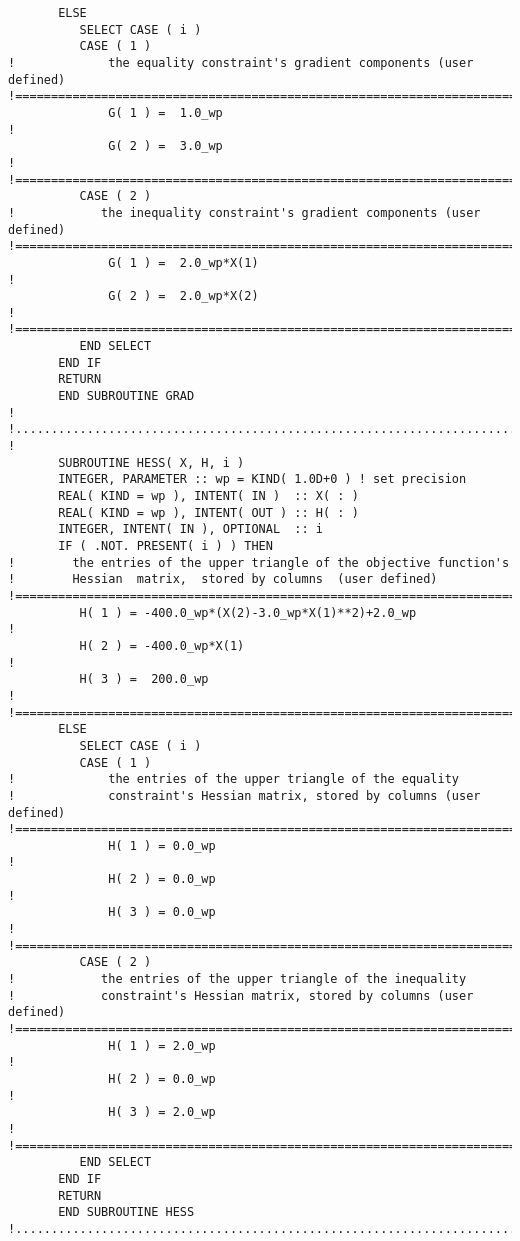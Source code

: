 \documentclass{galahad}
\begin{document}
{\begin{verbatim}
       ELSE
          SELECT CASE ( i )
          CASE ( 1 )   
!             the equality constraint's gradient components (user defined)
!==============================================================================
              G( 1 ) =  1.0_wp                                                !
              G( 2 ) =  3.0_wp                                                !
!==============================================================================
          CASE ( 2 )    
!            the inequality constraint's gradient components (user defined)
!==============================================================================
              G( 1 ) =  2.0_wp*X(1)                                           !
              G( 2 ) =  2.0_wp*X(2)                                           !
!==============================================================================
          END SELECT
       END IF
       RETURN
       END SUBROUTINE GRAD
!
!.............................................................................
!
       SUBROUTINE HESS( X, H, i )
       INTEGER, PARAMETER :: wp = KIND( 1.0D+0 ) ! set precision
       REAL( KIND = wp ), INTENT( IN )  :: X( : )
       REAL( KIND = wp ), INTENT( OUT ) :: H( : )
       INTEGER, INTENT( IN ), OPTIONAL  :: i
       IF ( .NOT. PRESENT( i ) ) THEN
!        the entries of the upper triangle of the objective function's 
!        Hessian  matrix,  stored by columns  (user defined) 
!==============================================================================
          H( 1 ) = -400.0_wp*(X(2)-3.0_wp*X(1)**2)+2.0_wp                     !
          H( 2 ) = -400.0_wp*X(1)                                             !
          H( 3 ) =  200.0_wp                                                  !
!==============================================================================
       ELSE
          SELECT CASE ( i )
          CASE ( 1 )
!             the entries of the upper triangle of the equality 
!             constraint's Hessian matrix, stored by columns (user defined)
!==============================================================================
              H( 1 ) = 0.0_wp                                                 !
              H( 2 ) = 0.0_wp                                                 !
              H( 3 ) = 0.0_wp                                                 !
!==============================================================================
          CASE ( 2 )
!            the entries of the upper triangle of the inequality 
!            constraint's Hessian matrix, stored by columns (user defined) 
!==============================================================================
              H( 1 ) = 2.0_wp                                                 !
              H( 2 ) = 0.0_wp                                                 !
              H( 3 ) = 2.0_wp                                                 !
!==============================================================================
          END SELECT
       END IF
       RETURN
       END SUBROUTINE HESS
!..............................................................................
\end{verbatim} }\def\baselinestretch{1.0}
\end{document}
